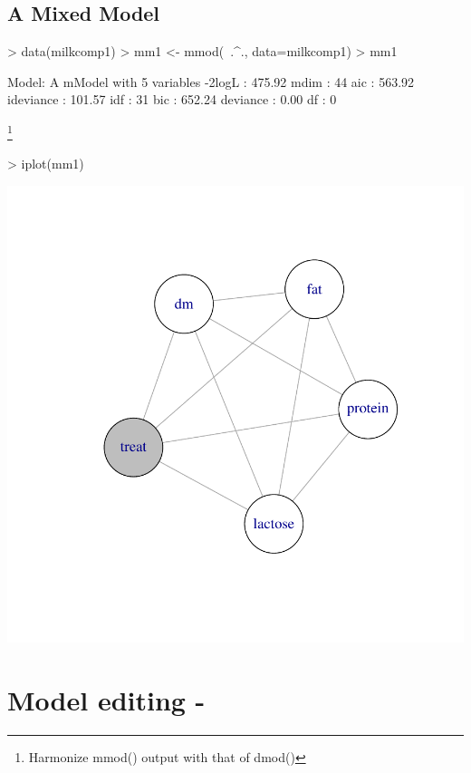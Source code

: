 \documentclass[12pt]{article}
\begin{document}
\subsection{A Mixed Model}

\begin{Schunk}
\begin{Sinput}
> data(milkcomp1)
> mm1 <- mmod(~.^., data=milkcomp1)
> mm1
\end{Sinput}
\begin{Soutput}
Model: A mModel with 5 variables
 -2logL    :         475.92 mdim :   44 aic :       563.92 
 ideviance :         101.57 idf  :   31 bic :       652.24 
 deviance  :           0.00 df   :    0 
\end{Soutput}
\end{Schunk}

\footnote{Harmonize mmod() output with that of dmod()}

\begin{Schunk}
\begin{Sinput}
> iplot(mm1)
\end{Sinput}
\end{Schunk}
\includegraphics{figures/GRIM-015}




\section{Model editing - }
\end{document}
